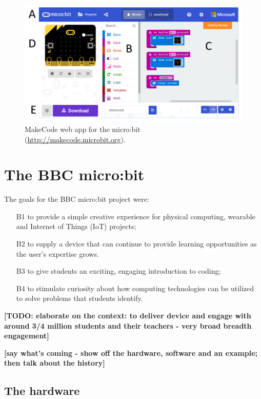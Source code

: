 \begin{figure}[t]
    \includegraphics[width=6in]{images/webApp.png}
    \caption{\label{fig:snapshot}MakeCode web app for the micro:bit (\url{http://makecode.microbit.org}).}
  \end{figure}

\section{The BBC micro:bit}
\label{sec:microbit}

The goals for the BBC micro:bit project were:
\begin{itemize}
    \item[B1] to provide a simple creative experience for physical computing, wearable and Internet of Things (IoT) projects;
    \item[B2] to supply a device that can continue to provide learning opportunities as the user's expertise grows.
    \item[B3] to give students an exciting, engaging introduction to coding;
    \item[B4] to stimulate curiosity about how computing technologies can be utilized to solve problems that students identify.
\end{itemize}

{\bf [TODO: elaborate on the context:  to deliver device and engage
with around 3/4 million students and their teachers - very broad breadth engagement]}

{\bf [say what's coming - show off the hardware, software and an example; then
talk about the history]}

\subsection{The hardware}

